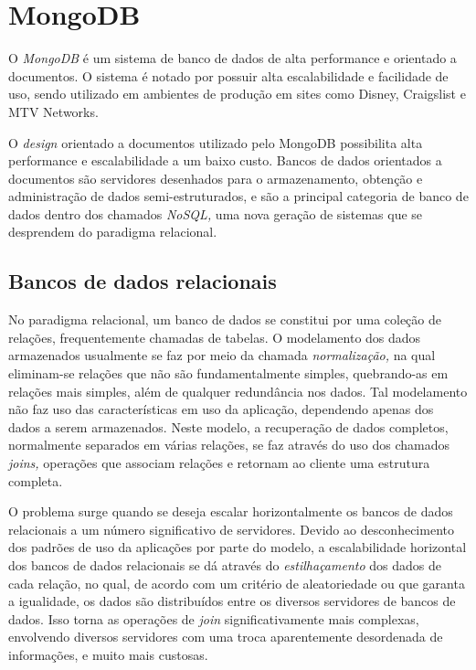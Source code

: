 \documentclass[ruledheader, 12pt]{abnt}
\begin{document}
\section{MongoDB}

O \emph{MongoDB} é um sistema de banco de dados de alta performance e orientado a documentos. O sistema é notado por possuir alta escalabilidade e facilidade de uso, sendo utilizado em ambientes de produção em sites como Disney, Craigslist e MTV Networks.

O \emph{design} orientado a documentos utilizado pelo MongoDB possibilita alta performance e escalabilidade a um baixo custo. Bancos de dados orientados a documentos são servidores desenhados para o armazenamento, obtenção e administração de dados semi-estruturados, e são a principal categoria de banco de dados dentro dos chamados \emph{NoSQL,} uma nova geração de sistemas que se desprendem do paradigma relacional.

\subsection{Bancos de dados relacionais}

No paradigma relacional, um banco de dados se constitui por uma coleção de relações, frequentemente chamadas de tabelas. O modelamento dos dados armazenados usualmente se faz por meio da chamada \emph{normalização,} na qual eliminam-se relações que não são fundamentalmente simples, quebrando-as em relações mais simples, além de qualquer redundância nos dados. Tal modelamento não faz uso das características em uso da aplicação, dependendo apenas dos dados a serem armazenados. Neste modelo, a recuperação de dados completos, normalmente separados em várias relações, se faz através do uso dos chamados \emph{joins,} operações que associam relações e retornam ao cliente uma estrutura completa.

O problema surge quando se deseja escalar horizontalmente os bancos de dados relacionais a um número significativo de servidores. Devido ao desconhecimento dos padrões de uso da aplicações por parte do modelo, a escalabilidade horizontal dos bancos de dados relacionais se dá através do \emph{estilhaçamento} dos dados de cada relação, no qual, de acordo com um critério de aleatoriedade ou que garanta a igualidade, os dados são distribuídos entre os diversos servidores de bancos de dados. Isso torna as operações de \emph{join} significativamente mais complexas, envolvendo diversos servidores com uma troca aparentemente desordenada de informações, e muito mais custosas.
\end{document}
